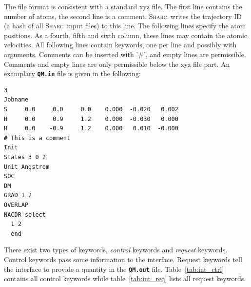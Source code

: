 \documentclass[a4paper,11pt,DIV=15,openany,twoside=false]{scrbook}
\newcommand{\sharc}{\textsc{Sharc}}
\newcommand{\ttt}[1]{\textbf{\texttt{#1}}}
\newenvironment{example}{
  \vspace{0mm}
  \definecolor{shadecolor}{HTML}{E4F4FF}
  \begin{shaded}
}{
  \end{shaded}
}
\begin{document}
The file format is consistent with a standard xyz file. The first line contains the number of atoms, the second line is a comment. \sharc\ writes the trajectory ID (a hash of all \sharc\ input files) to this line. The following lines specify the atom positions. As a fourth, fifth and sixth column, these lines may contain the atomic velocities.
All following lines contain keywords, one per line and possibly with arguments. Comments can be inserted with '\#', and empty lines are permissible. Comments and empty lines are only permissible below the xyz file part.
An examplary \ttt{QM.in} file is given in the following:
\begin{example}
  \begin{verbatim}
3
Jobname
S     0.0     0.0     0.0    0.000  -0.020   0.002
H     0.0     0.9     1.2    0.000  -0.030   0.000
H     0.0    -0.9     1.2    0.000   0.010  -0.000
# This is a comment
Init
States 3 0 2
Unit Angstrom
SOC
DM
GRAD 1 2
OVERLAP
NACDR select
  1 2
  end
  \end{verbatim}
\end{example}

There exist two types of keywords, \textit{control} keywords and \textit{request} keywords. Control keywords pass some information to the interface. Request keywords tell the interface to provide a quantity in the \ttt{QM.out} file. Table~\ref{tab:int_ctrl} contains all control keywords while table~\ref{tab:int_req} lists all request keywords.
\end{document}
